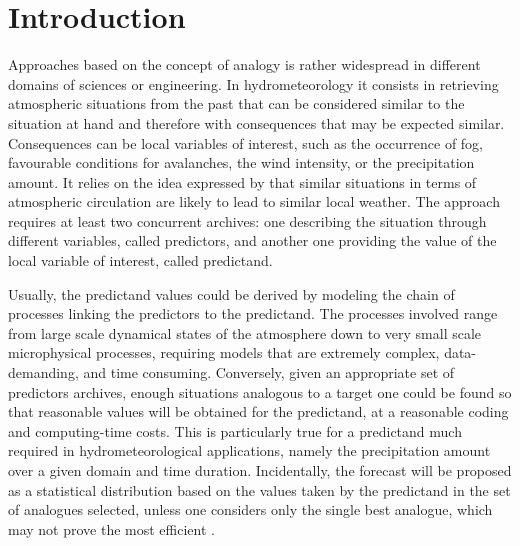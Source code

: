 \documentclass[review]{elsarticle}
\begin{document}
\linenumbers


\section{Introduction}

Approaches based on the concept of analogy is rather widespread in different domains of sciences or engineering. In hydrometeorology it consists in retrieving atmospheric situations from the past that can be considered similar to the situation at hand and therefore with consequences that may be expected similar. Consequences can be local variables of interest, such as the occurrence of fog, favourable conditions for avalanches, the wind intensity, or the precipitation amount. It relies on the idea expressed by \citet{Lorenz1956, Lorenz1969} that similar situations in terms of atmospheric circulation are likely to lead to similar local weather. The approach requires at least two concurrent archives: one describing the situation through different variables, called predictors, and another one providing the value of the local variable of interest, called predictand.

Usually, the predictand values could be derived by modeling the chain of processes linking the predictors to the predictand. The processes involved range from large scale dynamical states of the atmosphere down to very small scale microphysical processes, requiring models that are extremely complex, data-demanding, and time consuming. Conversely, given an appropriate set of predictors archives, enough situations analogous to a target one could be found so that reasonable values will be obtained for the predictand, at a reasonable coding and computing-time costs. This is particularly true for a predictand much required in hydrometeorological applications, namely the precipitation amount over a given domain and time duration. Incidentally, the forecast will be proposed as a statistical distribution based on the values taken by the predictand in the set of analogues selected, unless one considers only the single best analogue, which may not prove the most efficient \citep{Bontron2005}.
\end{document}
